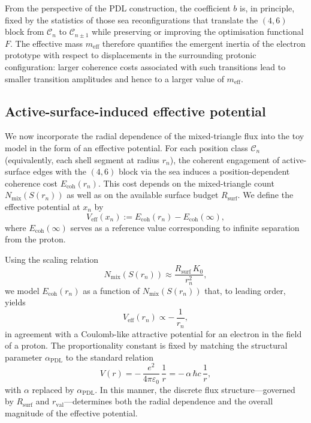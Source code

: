 \documentclass[11pt,a4paper]{article}
\begin{document}
From the perspective of the PDL construction, the coefficient $b$ is, in principle, fixed by the statistics of those sea reconfigurations that translate the $(4,6)$ block from $\mathcal{C}_{n}$ to $\mathcal{C}_{n\pm 1}$ while preserving or improving the optimisation functional $F$.
The effective mass $m_{\mathrm{eff}}$ therefore quantifies the emergent inertia of the electron prototype with respect to displacements in the surrounding protonic configuration: larger coherence costs associated with such transitions lead to smaller transition amplitudes and hence to a larger value of $m_{\mathrm{eff}}$.\cite{Laubscher2026FullPDL,Laubscher2026SchrodingerSketch}

\subsection{Active-surface-induced effective potential}

We now incorporate the radial dependence of the mixed-triangle flux into the toy model in the form of an effective potential.
For each position class $\mathcal{C}_{n}$ (equivalently, each shell segment at radius $r_{n}$), the coherent engagement of active-surface edges with the $(4,6)$ block via the sea induces a position-dependent coherence cost $E_{\mathrm{coh}}(r_{n})$.
This cost depends on the mixed-triangle count $N_{\mathrm{mix}}(S(r_{n}))$ as well as on the available surface budget $R_{\mathrm{surf}}$.\cite{Laubscher2026Alpha,Laubscher2026SchrodingerPDL}
We define the effective potential at $x_{n}$ by
\begin{equation}
V_{\mathrm{eff}}(x_{n}) := E_{\mathrm{coh}}(r_{n}) - E_{\mathrm{coh}}(\infty),
\label{eq:VeffDef}
\end{equation}
where $E_{\mathrm{coh}}(\infty)$ serves as a reference value corresponding to infinite separation from the proton.

Using the scaling relation
\[
N_{\mathrm{mix}}(S(r_{n})) \approx \frac{R_{\mathrm{surf}}\,K_{0}}{r_{n}^{2}},
\]
we model $E_{\mathrm{coh}}(r_{n})$ as a function of $N_{\mathrm{mix}}(S(r_{n}))$ that, to leading order, yields
\begin{equation}
V_{\mathrm{eff}}(r_{n}) \propto -\,\frac{1}{r_{n}},
\label{eq:VeffCoulomb}
\end{equation}
in agreement with a Coulomb-like attractive potential for an electron in the field of a proton.\cite{Laubscher2026SchrodingerPDL}
The proportionality constant is fixed by matching the structural parameter $\alpha_{\mathrm{PDL}}$ to the standard relation
\[
V(r) = -\,\frac{e^{2}}{4\pi\varepsilon_{0}}\,\frac{1}{r}
= -\,\alpha\,\hbar c\,\frac{1}{r},
\]
with $\alpha$ replaced by $\alpha_{\mathrm{PDL}}$.
In this manner, the discrete flux structure—governed by $R_{\mathrm{surf}}$ and $r_{\mathrm{val}}$—determines both the radial dependence and the overall magnitude of the effective potential.\cite{Laubscher2026Alpha}
\end{document}
